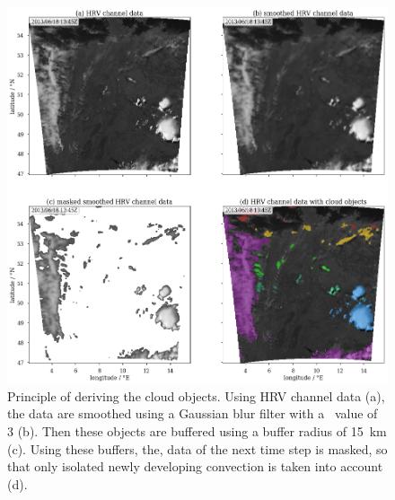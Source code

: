 \begin{figure}[htbp]
\centering
\includegraphics[width=\textwidth]{Grafiken/Abbildungen/wolkenobjektprinzip.png}
\caption{Principle of deriving the cloud objects. Using HRV channel data (a), the data are smoothed using a Gaussian blur filter with a \textsigma~value of 3 (b). Then these objects are buffered using a buffer radius of \SI{15}{\kilo\metre} (c). Using these buffers, the, data of the next time step is masked, so that only isolated newly developing convection is taken into account (d). }
\label{fig:hrv_seg}
\end{figure}

